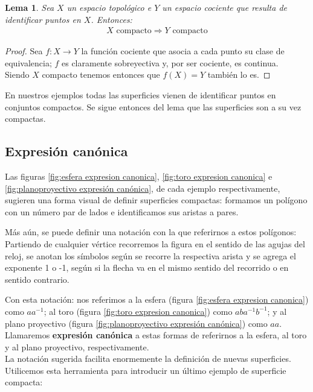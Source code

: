\documentclass[a4paper,11pt,spanish, twoside, leqno]{tfg-uam}
\newtheorem{lema}[teor]{Lema}
\theoremstyle{definition}
\begin{document}
\begin{lema}\label{lema:compacidadDePoligonos}
	Sea $X$ un espacio topológico e $Y$  un espacio cociente que resulta de identificar puntos en $X$. Entonces:
	\begin{align*}
	\text{$X$ compacto}\Rightarrow\text{$Y$ compacto}
	\end{align*}
\end{lema}
\begin{proof}
	Sea $f:X\longrightarrow Y$ la función cociente que asocia a cada punto su clase de equivalencia; $f$ es claramente sobreyectiva y, por ser cociente, es continua.\\
	Siendo $X$ compacto tenemos entonces que $f(X)=Y$ también lo es.
\end{proof}
En nuestros ejemplos todas las superficies vienen de identificar puntos en conjuntos compactos. Se sigue entonces del lema que las superficies son a su vez compactas.

\subsection{Expresión canónica}
\label{subsec:expcanonica}

Las figuras \ref{fig:esfera expresion canonica}, \ref{fig:toro expresion canonica} e \ref{fig:planoproyectivo expresión canónica}, de cada ejemplo respectivamente, sugieren una forma visual de definir superficies compactas: formamos un polígono con un número par de lados e identificamos sus aristas a pares. 

Más aún, se puede definir una notación con la que referirnos a estos polígonos: \\
Partiendo de cualquier vértice recorremos la figura en el sentido de las agujas del reloj, se anotan los símbolos según se recorre la respectiva arista y se agrega el exponente 1 o -1, según si la flecha va en el mismo sentido del recorrido o en sentido contrario.

Con esta notación: nos referimos  a la esfera (figura \ref{fig:esfera expresion canonica}) como $ aa^{-1} $; al toro (figura \ref{fig:toro expresion canonica})  como $ aba^{-1}b^{-1} $; y al plano proyectivo (figura \ref{fig:planoproyectivo expresión canónica}) como $ aa $. Llamaremos \textbf{expresión canónica} a estas formas de referirnos a la esfera, al toro y al plano proyectivo, respectivamente.
\\

La notación sugerida facilita enormemente la definición de nuevas superficies. Utilicemos esta herramienta para introducir un último ejemplo de superficie compacta:
\end{document}
